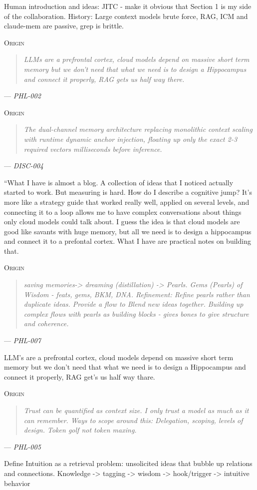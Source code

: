 \documentclass[11pt]{article}
\newcommand{\originquote}[1]{%
  \begin{quote}
  \textit{#1}
  \end{quote}
}
\newcommand{\originmark}{%
  \textsc{Origin}\enspace
}
\begin{document}
Human introduction and ideas: JITC - make it obvious that Section 1 is my side of the collaboration. History: Large context models brute force, RAG, ICM and claude-mem are passive, grep is brittle. \cite{PHL001}

\noindent\originmark
\originquote{LLMs are a prefrontal cortex, cloud models depend on massive short term memory but we don’t need that what we need is to design a Hippocampus and connect it properly, RAG gets us half way there.}
\hfill --- \textit{PHL-002}

\noindent\originmark
\originquote{The dual-channel memory architecture replacing monolithic context scaling with runtime dynamic anchor injection, floating up only the exact 2-3 required vectors milliseconds before inference.}
\hfill --- \textit{DISC-004}

“What I have is almost a blog. A collection of ideas that I noticed actually started to work. But measuring is hard. How do I describe a cognitive jump? It's more like a strategy guide that worked really well, applied on several levels, and connecting it to a loop allows me to have complex conversations about things only cloud models could talk about. I guess the idea is that cloud models are good like savants with huge memory, but all we need is to design a hippocampus and connect it to a prefontal cortex. What I have are practical notes on building that. \cite{PHL002} \cite{DISC004}

\noindent\originmark
\originquote{saving memories-> dreaming (distillation) -> Pearls. Gems (Pearls) of Wisdom - feats, gems, BKM, DNA. Refinement: Refine pearls rather than duplicate ideas. Provide a flow to Blend new ideas together. Building up complex flows with pearls as building blocks - gives bones to give structure and coherence.}
\hfill --- \textit{PHL-007}

LLM’s are a prefrontal cortex, cloud models depend on massive short term memory but we don’t need that what we need is to design a Hippocampus and connect it properly, RAG get’s us half way thare. \cite{PHL007}

\noindent\originmark
\originquote{Trust can be quantified as context size. I only trust a model as much as it can remember. Ways to scope around this: Delegation, scoping, levels of design. Token golf not token maxing.}
\hfill --- \textit{PHL-005}

Define Intuition as a retrieval problem: unsolicited ideas that bubble up relations and connections. Knowledge -> tagging -> wisdom -> hook/trigger -> intuitive behavior \cite{PHL005}
\end{document}

